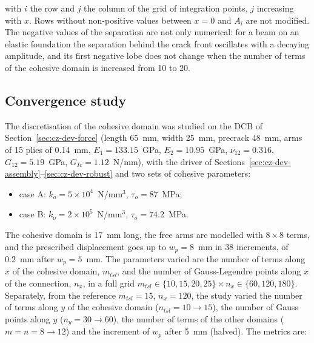 \noindent with $i$ the row and $j$ the column of the grid of integration points, $j$ increasing with $x$. Rows without non-positive values between $x=0$ and $A_i$ are not modified. The negative values of the separation are not only numerical: for a beam on an elastic foundation the separation behind the crack front oscillates with a decaying amplitude, and its first negative lobe does not change when the number of terms of the cohesive domain is increased from 10 to 20.

\subsection{Convergence study}\label{sec:cz-dev-convergence-study}

The discretisation of the cohesive domain was studied on the DCB of Section~\ref{sec:cz-dev-force} (length 65~mm, width 25~mm, precrack 48~mm, arms of 15 plies of 0.14~mm, $E_1 = 133.15$~GPa, $E_2 = 10.95$~GPa, $\nu_{12} = 0.316$, $G_{12} = 5.19$~GPa, $G_{Ic} = 1.12$~N/mm), with the driver of Sections~\ref{sec:cz-dev-assembly}--\ref{sec:cz-dev-robust} and two sets of cohesive parameters:

\begin{itemize}
	\item case A: $k_o = 5 \times 10^4$~N/mm$^3$, $\tau_o = 87$~MPa;
	\item case B: $k_o = 2 \times 10^5$~N/mm$^3$, $\tau_o = 74.2$~MPa.
\end{itemize}

The cohesive domain is 17~mm long, the free arms are modelled with $8 \times 8$ terms, and the prescribed displacement goes up to $w_p = 8$~mm in 38 increments, of 0.2~mm after $w_p = 5$~mm. The parameters varied are the number of terms along $x$ of the cohesive domain, $m_{tsl}$, and the number of Gauss-Legendre points along $x$ of the connection, $n_x$, in a full grid $m_{tsl} \in \{10, 15, 20, 25\} \times n_x \in \{60, 120, 180\}$. Separately, from the reference $m_{tsl} = 15$, $n_x = 120$, the study varied the number of terms along $y$ of the cohesive domain ($n_{tsl} = 10 \to 15$), the number of Gauss points along $y$ ($n_y = 30 \to 60$), the number of terms of the other domains ($m = n = 8 \to 12$) and the increment of $w_p$ after 5~mm (halved). The metrics are:


